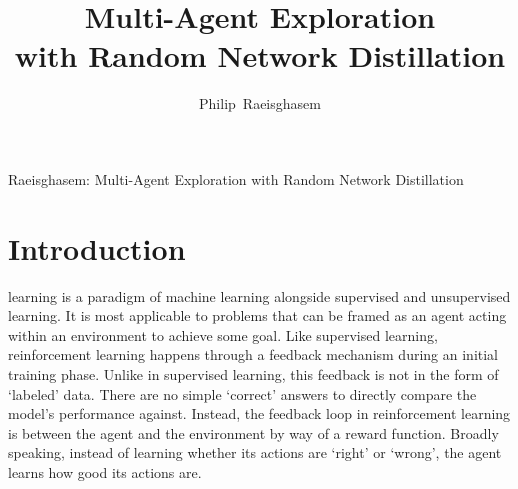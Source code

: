 \documentclass[11pt,journal,compsoc]{IEEEtran}
\begin{document}
\title{Multi-Agent Exploration\\ with Random Network Distillation}


\author{Philip~Raeisghasem%
}



%
{Raeisghasem: Multi-Agent Exploration with Random Network Distillation}




\maketitle
\IEEEdisplaynontitleabstractindextext
\IEEEpeerreviewmaketitle


\section{Introduction}
 learning is a paradigm of machine learning alongside supervised and unsupervised learning. It is most applicable to problems that can be framed as an agent acting within an environment to achieve some goal. Like supervised learning, reinforcement learning happens through a feedback mechanism during an initial training phase. Unlike in supervised learning, this feedback is not in the form of `labeled' data. There are no simple `correct' answers to directly compare the model's performance against. Instead, the feedback loop in reinforcement learning is between the agent and the environment by way of a reward function. Broadly speaking, instead of learning whether its actions are `right' or `wrong', the agent learns how good its actions are. 
\end{document}
